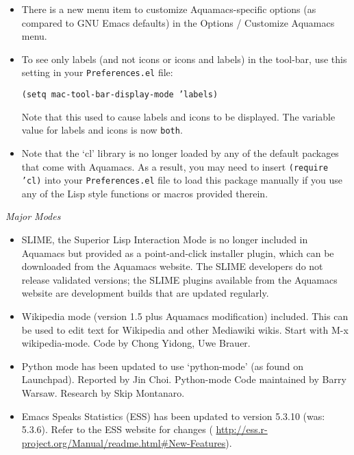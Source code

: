 \begin{itemize}
\item There is a new menu item to customize Aquamacs-specific options (as compared to GNU Emacs defaults) in the 
Options / Customize Aquamacs menu.

\item To see only labels (and not icons or icons and labels) in the tool-bar, use this setting in your {\tt Preferences.el} file:

{\tt (setq mac-tool-bar-display-mode 'labels)}

Note that this used to cause labels and icons to be displayed.  The variable value for labels and icons is now {\tt both}.

\item Note that  the `cl' library is no longer loaded by any of the default packages that come with Aquamacs.  As a result, you may need to insert {\tt (require 'cl)} into your {\tt Preferences.el} file to load this package manually if you use any of the Lisp style functions or macros provided therein.

\end{itemize}

\emph{Major Modes}

\begin{itemize}

\item SLIME, the Superior Lisp Interaction Mode is no longer included in Aquamacs but provided as a point-and-click installer plugin, which can be downloaded from the Aquamacs website.  The SLIME developers do not release validated versions; the SLIME plugins available from the Aquamacs website are development builds that are updated regularly. 

\item Wikipedia mode (version 1.5 plus Aquamacs modification) included.  This can be used to edit text for Wikipedia and other Mediawiki wikis.  Start with M-x wikipedia-mode.
Code by Chong Yidong, Uwe Brauer.

\item Python mode has been updated to use `python-mode'  (as found on Launchpad).  
Reported by Jin Choi.  Python-mode Code maintained by Barry Warsaw.  Research by Skip Montanaro. 

\item Emacs Speaks Statistics (ESS) has been updated to version 5.3.10 (was: 5.3.6).  Refer to the ESS website for changes ({\small{ \url{http://ess.r-project.org/Manual/readme.html#New-Features}}}).

\end{itemize}

